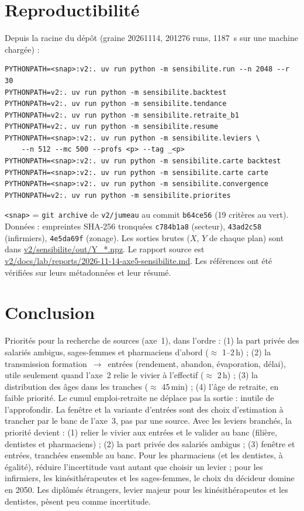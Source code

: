 \section{Reproductibilité}
Depuis la racine du dépôt (graine \num{20261114}, \num{201276} runs, \SI{1187}{\second}\mesure{} sur une machine chargée) :
\begin{verbatim}
PYTHONPATH=<snap>:v2:. uv run python -m sensibilite.run --n 2048 --r 30
PYTHONPATH=v2:. uv run python -m sensibilite.backtest
PYTHONPATH=v2:. uv run python -m sensibilite.tendance
PYTHONPATH=v2:. uv run python -m sensibilite.retraite_b1
PYTHONPATH=v2:. uv run python -m sensibilite.resume
PYTHONPATH=<snap>:v2:. uv run python -m sensibilite.leviers \
    --n 512 --mc 500 --profs <p> --tag _<p>
PYTHONPATH=<snap>:v2:. uv run python -m sensibilite.carte backtest
PYTHONPATH=<snap>:v2:. uv run python -m sensibilite.carte carte
PYTHONPATH=<snap>:v2:. uv run python -m sensibilite.convergence
PYTHONPATH=v2:. uv run python -m sensibilite.priorites
\end{verbatim}
\texttt{<snap>} = \texttt{git archive} de \texttt{v2/jumeau} au commit \texttt{b64ce56} (19 critères au vert).
Données : empreintes SHA-256 tronquées \texttt{c784b1a8} (secteur), \texttt{43ad2c58} (infirmiers), \texttt{4e5da69f} (zonage). Les sorties brutes ($X$, $Y$ de chaque plan) sont dans \url{v2/sensibilite/out/Y_*.npz}. Le rapport source est \url{v2/docs/lab/reports/2026-11-14-axe5-sensibilite.md}. Les références ont été vérifiées sur leurs
métadonnées et leur résumé.

\section{Conclusion}
Priorités pour la recherche de sources (axe~1), dans l'ordre : (1) la part privée des salariés ambigus,
sages-femmes et pharmaciens d'abord ($\approx$ 1--2\,h\suppose{}) ; (2) la transmission formation~$\to$~entrées
(rendement, abandon, évaporation, délai), utile seulement quand l'axe~2 relie le vivier à l'effectif
($\approx$ 2\,h\suppose{}) ; (3) la distribution des âges dans les tranches ($\approx$ 45\,min\suppose{}) ;
(4) l'âge de retraite, en faible priorité. Le cumul emploi-retraite ne déplace pas la sortie : inutile de
l'approfondir. La fenêtre et la variante d'entrées sont des choix d'estimation à trancher par le banc de
l'axe~3, pas par une source. Avec les leviers branchés, la priorité devient : (1) relier le vivier aux entrées et le valider au
banc (filière, dentistes et pharmaciens) ; (2) la part privée des salariés ambigus ; (3) fenêtre et entrées,
tranchées ensemble au banc. Pour les pharmaciens (et les dentistes, à égalité), réduire l'incertitude vaut autant
que choisir un levier ; pour les infirmiers, les kinésithérapeutes et les sages-femmes, le choix du décideur domine
en 2050. Les diplômés étrangers, levier majeur pour les kinésithérapeutes et les dentistes, pèsent peu comme
incertitude.


